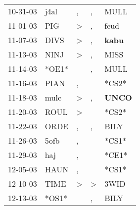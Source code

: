\begin{supertabular}{p{0.07\textwidth}p{0.06\textwidth}p{0.02\textwidth}p{0.02\textwidth}p{0.06\textwidth}}
          10-31-03\textsuperscript{} &           j4al\textsuperscript{} &                , &                , &           MULL\textsuperscript{} \\
          11-01-03\textsuperscript{} &            PIG\textsuperscript{} &     \textgreater &                , &           feud\textsuperscript{} \\
          11-07-03\textsuperscript{} &           DIVS\textsuperscript{} &     \textgreater &                , &  \textbf{kabu\textsuperscript{}} \\
          11-13-03\textsuperscript{} &           NINJ\textsuperscript{} &     \textgreater &                , &           MISS\textsuperscript{} \\
          11-14-03\textsuperscript{} &                            *OE1* &                  &                , &           MULL\textsuperscript{} \\
          11-16-03\textsuperscript{} &           PIAN\textsuperscript{} &                , &                  &                            *CS2* \\
          11-18-03\textsuperscript{} &           mulc\textsuperscript{} &     \textgreater &                , &  \textbf{UNCO\textsuperscript{}} \\
          11-20-03\textsuperscript{} &           ROUL\textsuperscript{} &     \textgreater &                  &                            *CS2* \\
          11-22-03\textsuperscript{} &           ORDE\textsuperscript{} &                , &                , &           BILY\textsuperscript{} \\
          11-26-03\textsuperscript{} &           5ofb\textsuperscript{} &                , &                  &                            *CS1* \\
          11-29-03\textsuperscript{} &            haj\textsuperscript{} &                , &                  &                            *CE1* \\
          12-05-03\textsuperscript{} &           HAUN\textsuperscript{} &                , &                  &                            *CS1* \\
          12-10-03\textsuperscript{} &           TIME\textsuperscript{} &     \textgreater &     \textgreater &           3WID\textsuperscript{} \\
          12-13-03\textsuperscript{} &                            *OS1* &                  &                , &           BILY\textsuperscript{} \\

\end{supertabular}
